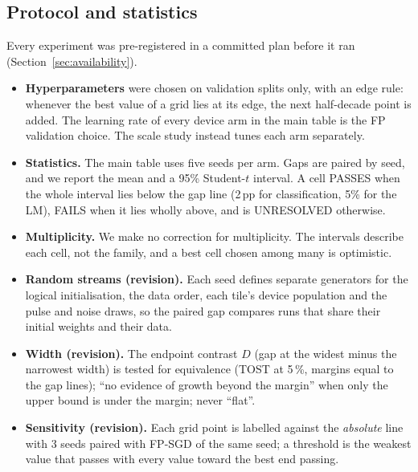 \subsection{Protocol and statistics}\label{sec:protocol}
Every experiment was pre-registered in a committed plan before it ran (Section~\ref{sec:availability}).
\begin{itemize}
\item \textbf{Hyperparameters} were chosen on validation splits only, with an edge rule: whenever the best value of a grid lies
      at its edge, the next half-decade point is added. The learning rate of every device arm in the main table is the FP
      validation choice. The scale study instead tunes each arm separately.
\item \textbf{Statistics.} The main table uses five seeds per arm. Gaps are paired by seed, and we report the mean and a 95\%
      Student-$t$ interval. A cell PASSES when the whole interval lies below the gap line (2\,pp for classification, 5\% for
      the LM), FAILS when it lies wholly above, and is UNRESOLVED otherwise.
\item \textbf{Multiplicity.} We make no correction for multiplicity. The intervals describe each cell, not the family, and a
      best cell chosen among many is optimistic.
\item \textbf{Random streams (revision).} Each seed defines separate generators for the logical initialisation, the data
      order, each tile's device population and the pulse and noise draws, so the paired gap compares runs that share their
      initial weights and their data.
\item \textbf{Width (revision).} The endpoint contrast $D$ (gap at the widest minus the narrowest width) is tested for
      equivalence (TOST at 5\,\%, margins equal to the gap lines); ``no evidence of growth beyond the margin'' when only the upper
      bound is under the margin; never ``flat''.
\item \textbf{Sensitivity (revision).} Each grid point is labelled against the \emph{absolute} line with 3 seeds paired with
      FP-SGD of the same seed; a threshold is the weakest value that passes with every value toward the best end passing.
\end{itemize}

